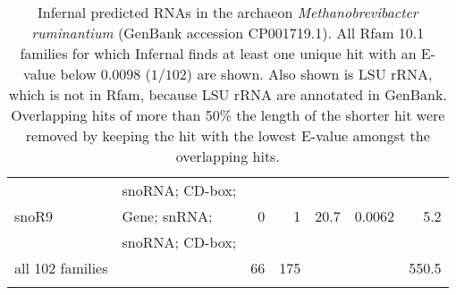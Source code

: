 \begin{small}
\begin{table}
\begin{center}
\begin{tabular}{|l|l|r|r|rr|r|}
                                &  snoRNA; CD-box;     &        &           &        &          &          \\
snoR9                           &  Gene; snRNA;        &     0  &        1  &   20.7 &   0.0062 &      5.2 \\
                                &  snoRNA; CD-box;     &        &           &        &          &          \\
all 102 families                &                      &    66  &      175  &        &          &     550.5\\ \hline
\multicolumn{7}{c}{} \\

\end{tabular}
\caption{Infernal predicted RNAs in the archaeon
  \emph{Methanobrevibacter ruminantium} (GenBank accession
  CP001719.1). All Rfam 10.1 families \cite{Gardner11} for which
  Infernal finds at least one unique hit with an E-value below
  $0.0098$ ($1/102$) 
  are shown. Also shown is LSU rRNA, which is not in Rfam, because LSU
  rRNA are annotated in GenBank. 
  Overlapping hits of more
  than 50\% the length of the shorter hit were removed by keeping
  the hit with the lowest E-value amongst the overlapping hits.}
\end{center}
\end{table}
\end{small}


